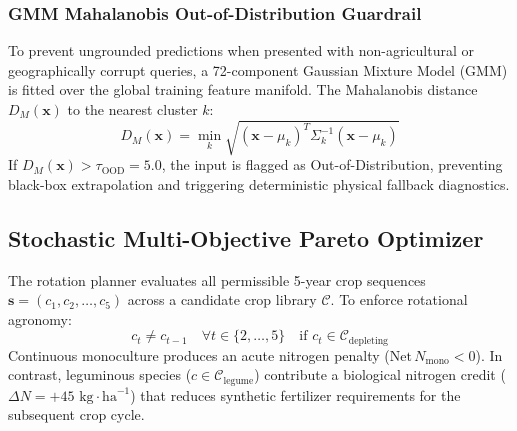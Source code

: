 \documentclass[10pt,twocolumn]{article}
\begin{document}
\subsubsection{GMM Mahalanobis Out-of-Distribution Guardrail}
To prevent ungrounded predictions when presented with non-agricultural or geographically corrupt queries, a 72-component Gaussian Mixture Model (GMM) is fitted over the global training feature manifold. The Mahalanobis distance $D_M(\mathbf{x})$ to the nearest cluster $k$:
\begin{equation}
D_M(\mathbf{x}) = \min_k \sqrt{(\mathbf{x} - \mu_k)^T \Sigma_k^{-1} (\mathbf{x} - \mu_k)}
\end{equation}
If $D_M(\mathbf{x}) > \tau_{\text{OOD}} = 5.0$, the input is flagged as Out-of-Distribution, preventing black-box extrapolation and triggering deterministic physical fallback diagnostics.

\subsection{Stochastic Multi-Objective Pareto Optimizer}
The rotation planner evaluates all permissible 5-year crop sequences $\mathbf{s} = (c_1, c_2, \dots, c_5)$ across a candidate crop library $\mathcal{C}$. To enforce rotational agronomy:
\begin{equation}
c_{t} \neq c_{t-1} \quad \forall t \in \{2,\dots,5\} \quad \text{if } c_{t} \in \mathcal{C}_{\text{depleting}}
\end{equation}
Continuous monoculture produces an acute nitrogen penalty ($\mathrm{Net}\,N_{\mathrm{mono}} < 0$). In contrast, leguminous species ($c \in \mathcal{C}_{\text{legume}}$) contribute a biological nitrogen credit ($\Delta N = +45\text{ kg}\cdot\text{ha}^{-1}$) that reduces synthetic fertilizer requirements for the subsequent crop cycle.
\end{document}
